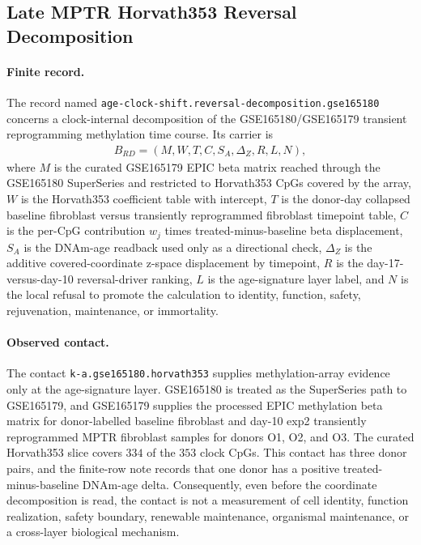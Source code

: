 \subsection{Late MPTR Horvath353 Reversal Decomposition}\label{sec:age-clock-shift-reversal-decomposition-gse165180}

\paragraph{Finite record.}
The record named \texttt{age-clock-shift.reversal-decomposition.gse165180} concerns a clock-internal decomposition of the GSE165180/GSE165179 transient reprogramming methylation time course. Its carrier is
$$
\begin{aligned}
B_{RD}=(M,W,T,C,S_A,\Delta_Z,R,L,N),
\end{aligned}
$$
where $M$ is the curated GSE165179 EPIC beta matrix reached through the GSE165180 SuperSeries and restricted to Horvath353 CpGs covered by the array, $W$ is the Horvath353 coefficient table with intercept, $T$ is the donor-day collapsed baseline fibroblast versus transiently reprogrammed fibroblast timepoint table, $C$ is the per-CpG contribution $w_j$ times treated-minus-baseline beta displacement, $S_A$ is the DNAm-age readback used only as a directional check, $\Delta_Z$ is the additive covered-coordinate z-space displacement by timepoint, $R$ is the day-17-versus-day-10 reversal-driver ranking, $L$ is the age-signature layer label, and $N$ is the local refusal to promote the calculation to identity, function, safety, rejuvenation, maintenance, or immortality.

\paragraph{Observed contact.}
The contact \texttt{k-a.gse165180.horvath353} supplies methylation-array evidence only at the age-signature layer. GSE165180 is treated as the SuperSeries path to GSE165179, and GSE165179 supplies the processed EPIC methylation beta matrix for donor-labelled baseline fibroblast and day-10 exp2 transiently reprogrammed MPTR fibroblast samples for donors O1, O2, and O3. The curated Horvath353 slice covers $334$ of the $353$ clock CpGs. This contact has three donor pairs, and the finite-row note records that one donor has a positive treated-minus-baseline DNAm-age delta. Consequently, even before the coordinate decomposition is read, the contact is not a measurement of cell identity, function realization, safety boundary, renewable maintenance, organismal maintenance, or a cross-layer biological mechanism.


